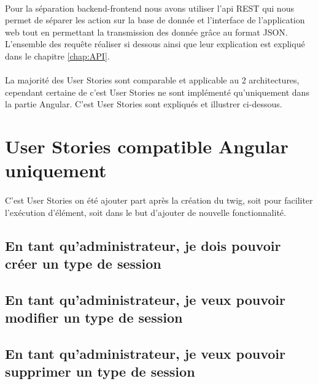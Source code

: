 \paragraph{}
	Pour la séparation backend-frontend nous avons utiliser l'api REST qui nous permet de séparer les action sur la base de donnée et l'interface de l'application web tout en permettant la transmission des donnée grâce au format JSON.
	L'ensemble des requête réaliser si dessous ainsi que leur explication est expliqué dans le chapitre \ref{chap:API}. 
	
\paragraph{}
	La majorité des User Stories sont comparable et applicable au 2 architectures, cependant certaine de c'est User Stories ne sont implémenté qu'uniquement dans la partie Angular. C'est User Stories sont expliqués et illustrer ci-dessous. 

\newpage
\section{User Stories compatible Angular uniquement}
	\paragraph{}
		C'est User Stories on été ajouter part après la création du twig, soit pour faciliter l'exécution d'élément, soit dans le but d'ajouter de nouvelle fonctionnalité. 
	
	\subsection{En tant qu'administrateur, je dois pouvoir créer un type de session}
		
	
	\newpage
	\subsection{En tant qu'administrateur, je veux pouvoir modifier un type de session}
		
	
	\newpage
	\subsection{En tant qu'administrateur, je veux pouvoir supprimer un type de session}
		
	
